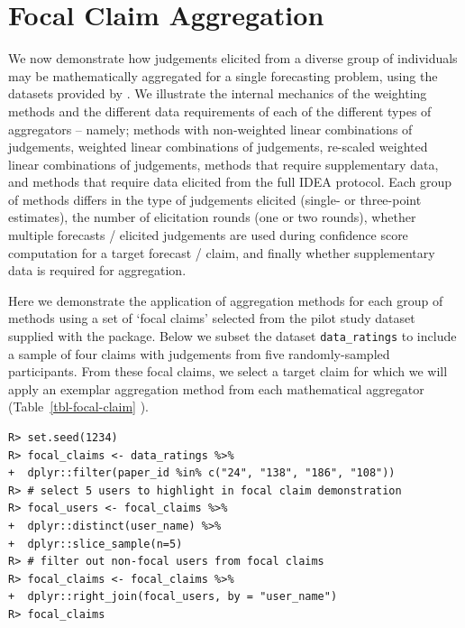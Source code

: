 \documentclass[article]{jss}
\begin{document}
\hypertarget{sec-focal-claims}{%
\section{Focal Claim Aggregation}\label{sec-focal-claims}}

We now demonstrate how judgements elicited from a diverse group of
individuals may be mathematically aggregated for a single forecasting
problem, using the datasets provided by . We illustrate
the internal mechanics of the weighting methods and the different data
requirements of each of the different types of aggregators -- namely;
methods with non-weighted linear combinations of judgements, weighted
linear combinations of judgements, re-scaled weighted linear
combinations of judgements, methods that require supplementary data, and
methods that require data elicited from the full IDEA protocol. Each
group of methods differs in the type of judgements elicited (single- or
three-point estimates), the number of elicitation rounds (one or two
rounds), whether multiple forecasts / elicited judgements are used
during confidence score computation for a target forecast / claim, and
finally whether supplementary data is required for aggregation.

Here we demonstrate the application of aggregation methods for each
group of methods using a set of `focal claims' selected from the pilot
study dataset supplied with the  package. Below we subset
the dataset \texttt{data\_ratings} to include a sample of four claims
with judgements from five randomly-sampled participants. From these
focal claims, we select a target claim for which we will apply an
exemplar aggregation method from each mathematical aggregator
(Table~\ref{tbl-focal-claim} ).

\begin{verbatim}
R> set.seed(1234)
R> focal_claims <- data_ratings %>% 
+  dplyr::filter(paper_id %in% c("24", "138", "186", "108"))
R> # select 5 users to highlight in focal claim demonstration
R> focal_users <- focal_claims %>% 
+  dplyr::distinct(user_name) %>% 
+  dplyr::slice_sample(n=5)
R> # filter out non-focal users from focal claims
R> focal_claims <- focal_claims %>%  
+  dplyr::right_join(focal_users, by = "user_name") 
R> focal_claims
\end{verbatim}
\end{document}
